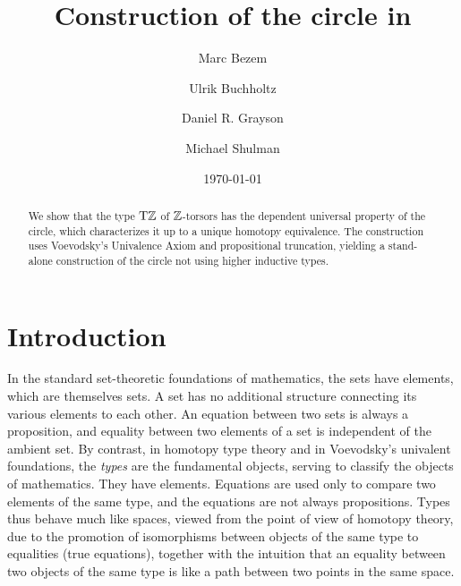 \documentclass[a4paper,12pt]{amsart}
\begin{document}
\title{Construction of the circle in \UniMath}
{
    \author{Marc Bezem}
    \address{Department of Informatics, University of Bergen}
}
{
    \author{Ulrik Buchholtz}
    \address{Department of Mathematics, Technical University of Darmstadt}
}
{
    \author{Daniel R. Grayson}
    \address{Department of Mathematics, University of Illinois at Urbana-Champaign}
}
{
    \author{Michael Shulman}
    \address{Department of Mathematics, University of San Diego}
}

\date{\today}

\begin{abstract}
We show that the type ${\mathrm{T}\mathbb{Z}}$ of $\mathbb{Z}$-torsors has the dependent universal property of the circle,
which characterizes it up to a unique homotopy equivalence.
The construction uses Voevodsky's Univalence Axiom and propositional truncation,
yielding a stand-alone construction of the
circle not using higher inductive types.
\end{abstract}

\maketitle
{}
\tableofcontents

\section{Introduction}

In the standard set-theoretic foundations of mathematics, the sets have elements, which are themselves sets.  A set has no additional structure
connecting its various elements to each other.  An equation between two sets is always a proposition, and equality between two elements of a set
is independent of the ambient set.  By contrast, in homotopy type theory and in Voevodsky's univalent foundations, the \emph{types} are the
fundamental objects, serving to classify the objects of mathematics.  They have elements.  Equations are used only to compare two elements of
the same type, and the equations are not always propositions.  Types thus behave much like spaces, viewed from the point of view of homotopy
theory, due to the promotion of isomorphisms between objects of the same type to equalities (true equations), together with the intuition that
an equality between two objects of the same type is like a path between two points in the same space.
\end{document}
